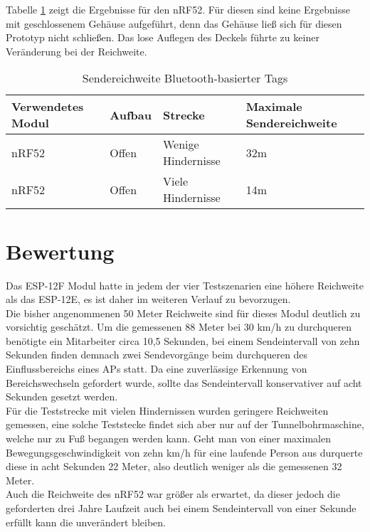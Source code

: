 Tabelle \ref{table:rangeblue} zeigt die Ergebnisse für den nRF52.
Für diesen sind keine Ergebnisse mit geschlossenem Gehäuse aufgeführt, denn das Gehäuse ließ sich für diesen Prototyp nicht schließen.
Das lose Auflegen des Deckels führte zu keiner Veränderung bei der Reichweite.

\begin{table}[h]
	\centering
	\caption{Sendereichweite Bluetooth-basierter Tags}
	\label{table:rangeblue}
	\begin{tabular}{p{3.5cm}|p{3cm}|p{3.5cm}|p{3cm}}
		Verwendetes Modul & Aufbau & Strecke & Maximale Sendereichweite \\
		\hline
		nRF52 & Offen & Wenige Hindernisse & 32m \\
		nRF52 & Offen & Viele Hindernisse & 14m \\
	\end{tabular}
\end{table}

\section{Bewertung}
Das ESP-12F Modul hatte in jedem der vier Testszenarien eine höhere Reichweite als das ESP-12E, es ist daher im weiteren Verlauf zu bevorzugen.\\
Die bisher angenommenen 50 Meter Reichweite sind für dieses Modul deutlich zu vorsichtig geschätzt. 
Um die gemessenen 88 Meter bei 30 km/h zu durchqueren benötigte ein Mitarbeiter circa 10,5 Sekunden, bei einem Sendeintervall von zehn Sekunden finden demnach zwei Sendevorgänge beim durchqueren des Einflussbereichs eines APs statt.
Da eine zuverlässige Erkennung von Bereichswechseln gefordert wurde, sollte das Sendeintervall konservativer auf acht Sekunden gesetzt werden.\\
Für die Teststrecke mit vielen Hindernissen wurden geringere Reichweiten gemessen, eine solche Teststecke findet sich aber nur auf der Tunnelbohrmaschine, welche nur zu Fuß begangen werden kann. 
Geht man von einer maximalen Bewegungsgeschwindigkeit von zehn km/h für eine laufende Person aus durquerte diese in acht Sekunden 22 Meter, also deutlich weniger als die gemessenen 32 Meter.\\
Auch die Reichweite des nRF52 war größer als erwartet, da dieser jedoch die geforderten drei Jahre Laufzeit auch bei einem Sendeintervall von einer Sekunde erfüllt kann die unverändert bleiben.
